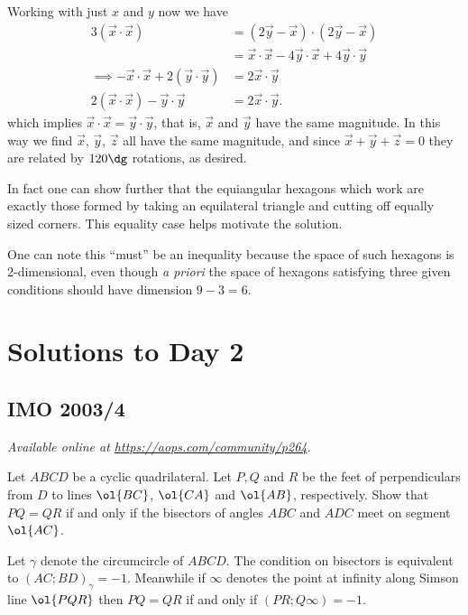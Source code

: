 \documentclass[11pt]{scrartcl}
\begin{document}
Working with just $x$ and $y$ now we have
\begin{align*}
  3 (\vec x \cdot \vec x) &= (2 \vec y - \vec x) \cdot (2 \vec y - \vec x) \\
  &= \vec x \cdot \vec x - 4 \vec y \cdot \vec x + 4 \vec y \cdot \vec y \\
  \implies
  -\vec x \cdot \vec x + 2 (\vec y \cdot \vec y) &= 2 \vec x \cdot \vec y \\
  2 (\vec x \cdot \vec x) - \vec y \cdot \vec y &= 2 \vec x \cdot \vec y.
\end{align*}
which implies $\vec x \cdot \vec x = \vec y \cdot \vec y$,
that is, $\vec x$ and $\vec y$ have the same magnitude.
In this way we find $\vec x$, $\vec y$, $\vec z$ all
have the same magnitude,
and since $\vec x + \vec y + \vec z = 0$
they are related by $120\dg$ rotations, as desired.

\begin{remark*}
  In fact one can show further that the equiangular hexagons
  which work are exactly those formed by taking an equilateral triangle
  and cutting off equally sized corners.
  This equality case helps motivate the solution.
\end{remark*}
\begin{remark*}
  One can note this ``must'' be an inequality
  because the space of such hexagons is $2$-dimensional,
  even though \emph{a priori} the space of hexagons satisfying
  three given conditions should have dimension $9-3=6$.
\end{remark*}
\pagebreak

\section{Solutions to Day 2}
\subsection{IMO 2003/4}
\textsl{Available online at \url{https://aops.com/community/p264}.}
\begin{mdframed}[style=mdpurplebox,frametitle={Problem statement}]
Let $ABCD$ be a cyclic quadrilateral.
Let $P, Q$ and $R$ be the feet of perpendiculars
from $D$ to lines $\ol{BC}$, $\ol{CA}$ and $\ol{AB}$, respectively.
Show that $PQ = QR$ if and only if the
bisectors of angles $ABC$ and $ADC$ meet on segment $\ol{AC}$.
\end{mdframed}
Let $\gamma$ denote the circumcircle of $ABCD$.
The condition on bisectors is equivalent to $(AC;BD)_\gamma = -1$.
Meanwhile if $\infty$ denotes the point at infinity along Simson line $\ol{PQR}$
then $PQ = QR$ if and only if $(PR;Q\infty) = -1$.
\end{document}
